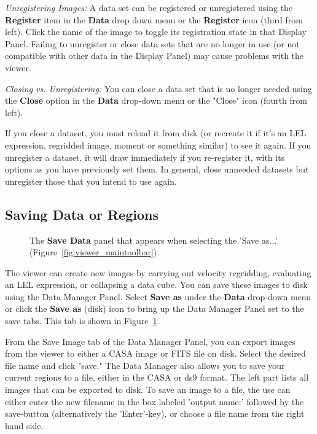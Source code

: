 {\em Unregistering Images:} A data set can be registered or unregistered using the {\bf Register}
item in the {\bf Data} drop down menu or the {\bf Register} icon (third from left). Click the name of the image to
toggle its registration state in that Display Panel. Failing to unregister or close data sets that are 
no longer in use (or not compatible with other data in the Display Panel) may cause problems with 
the viewer. 

{\em Closing vs. Unregistering:} You can close a data set that is no longer needed using the {\bf Close}
option in the {\bf Data} drop-down menu or the "Close" icon (fourth from left). 

If you close a dataset, you must reload it from disk (or recreate it if it's an LEL expression, regridded image, 
moment or something similar) to see it again.  If you unregister a dataset, it will draw immediately if you 
re-register it, with its options as you have 
previously set them.  In general, close unneeded datasets but unregister those that you intend to use again.

\subsection{Saving Data or Regions}
\label{section:display.viewerGUI.save}

\begin{figure}[h!]
\begin{center}
\caption{\label{fig:viewer_save} The {\bf Save Data} panel
that appears when selecting the 'Save as...'  (Figure~\ref{fig:viewer_maintoolbar}).} 
\hrulefill
\end{center}
\end{figure}

The viewer can create new images by carrying out velocity regridding, evaluating an LEL
expression, or collapsing a data cube. You can save these images to disk using the 
Data Manager Panel. Select {\bf Save as} under the {\bf Data} drop-down menu or
click the {\bf Save as} (disk) icon to bring up the Data Manager Panel set to the save tabs.
This tab is shown in Figure~\ref{fig:viewer_save}. 

From the Save Image tab of the Data Manager Panel, you can export images from the
viewer to either a CASA image or FITS file on disk. Select the desired file name and click
"save." The Data Manager also allows you to save your current regions to a file, either in the CASA
or ds9 format. The left part lists all images that can be exported to disk.  To save an
image to a file, the use can either enter the new filename in the box
labeled 'output name:' followed by the save-button (alternatively the
'Enter'-key), or choose a file name from the right hand side.

